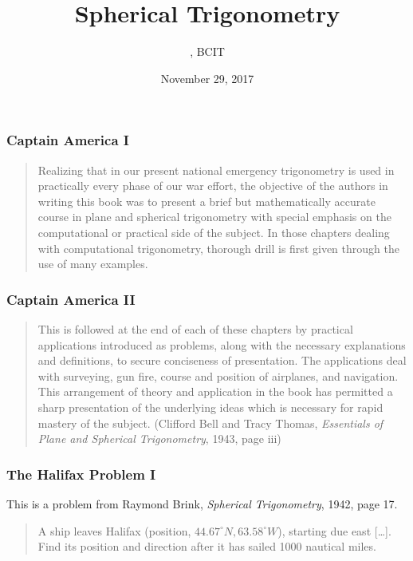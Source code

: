 \documentclass[xcolor=dvipsnames]{beamer}
\title{Spherical Trigonometry}
\subtitle{{\CourseNumber}, BCIT}
\author{\CourseName}
\date{November 29, 2017}
\begin{document}
\begin{frame}
  \titlepage
\end{frame}

\begin{frame}
  \frametitle{Captain America I}
  \begin{quote}
    Realizing that in our present national emergency trigonometry is
    used in practically every phase of our war effort, the objective
    of the authors in writing this book was to present a brief but
    mathematically accurate course in plane and spherical trigonometry
    with special emphasis on the computational or practical side of
    the subject. In those chapters dealing with computational
    trigonometry, thorough drill is first given through the use of
    many examples.
  \end{quote}
\end{frame}

\begin{frame}
  \frametitle{Captain America II}
  \begin{quote}
    This is followed at the end of each of these chapters by practical
    applications introduced as problems, along with the necessary
    explanations and definitions, to secure conciseness of
    presentation. The applications deal with surveying, gun fire,
    course and position of airplanes, and navigation. This arrangement
    of theory and application in the book has permitted a sharp
    presentation of the underlying ideas which is necessary for rapid
    mastery of the subject. (Clifford Bell and Tracy Thomas,
    \emph{Essentials of Plane and Spherical Trigonometry}, 1943, page
    iii)
  \end{quote}
\end{frame}

\begin{frame}
  \frametitle{The Halifax Problem I}
This is a problem from Raymond Brink, \emph{Spherical Trigonometry},
1942, page 17.
\begin{quote}
  A ship leaves Halifax (position, $44.67^{\circ}N,63.58^{\circ}W$),
  starting due east [{\ldots}]. Find its
  position and direction after it has sailed 1000 nautical miles.
\end{quote}
\end{frame}
\end{document}
